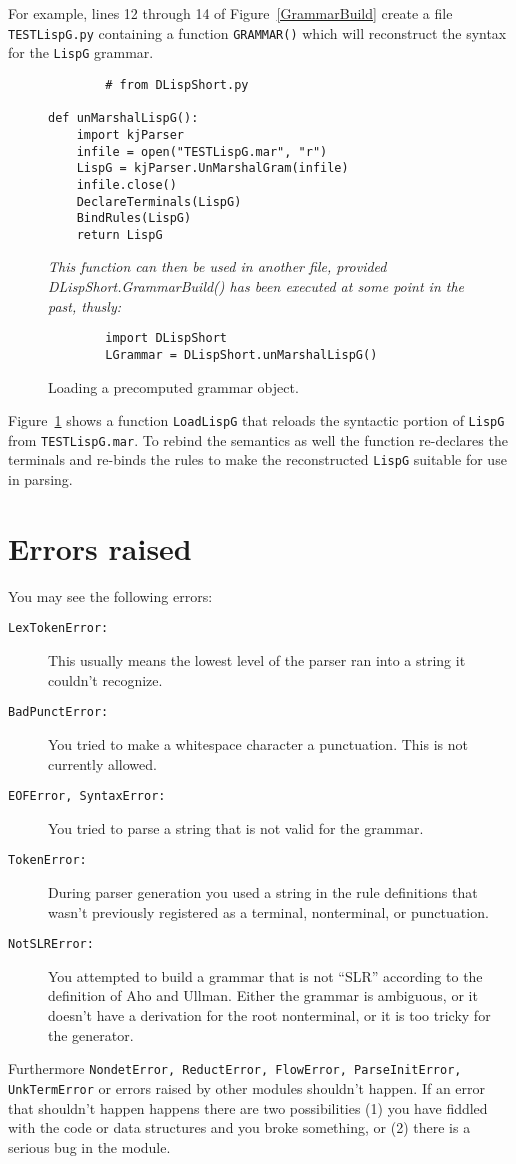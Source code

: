 For example, lines 12 through 14 of 
Figure~\ref{GrammarBuild} create a file {\tt TESTLispG.py}
containing a function {\tt GRAMMAR()} which will reconstruct
the syntax for the {\tt LispG} grammar.


\begin{figure}
\begin{verbatim}
        # from DLispShort.py

def unMarshalLispG():
    import kjParser
    infile = open("TESTLispG.mar", "r")
    LispG = kjParser.UnMarshalGram(infile)
    infile.close()
    DeclareTerminals(LispG)
    BindRules(LispG)
    return LispG
\end{verbatim}
{\em This function can then be used in another file,
provided {\em DLispShort.GrammarBuild()} has been executed
at some point in the past, thusly:}
\begin{verbatim}
        import DLispShort
        LGrammar = DLispShort.unMarshalLispG()
\end{verbatim}
\caption{Loading a precomputed grammar object.\label{Load}}
\end{figure}

Figure~\ref{Load} shows a function {\tt LoadLispG}
that reloads the syntactic
portion of {\tt LispG} from {\tt TESTLispG.mar}.  
To rebind the semantics as well the
function re-declares the terminals and re-binds the rules
to make the reconstructed {\tt LispG} suitable for use in parsing.

\section{Errors raised}

You may see the following errors:
\begin{description}
\item[\tt LexTokenError:]
This usually means the lowest level of the parser ran into a string
it couldn't recognize.
\item[\tt BadPunctError:]
You tried to make a whitespace character a punctuation.  
This is not currently allowed.
\item[\tt EOFError, SyntaxError:]
You tried to parse a string that is not valid for the grammar.
\item[\tt TokenError:]
During parser generation you used a string in the rule definitions
that wasn't previously registered as a terminal, nonterminal, or
punctuation.
\item[\tt NotSLRError:]
You attempted to build a grammar that is not ``SLR'' according
to the definition of Aho and Ullman.  Either the grammar is
ambiguous, or it doesn't have a derivation for the root
nonterminal, or it is too tricky for the generator.
\end{description}
Furthermore
{\tt NondetError, ReductError, FlowError, ParseInitError,
UnkTermError}
or errors raised by other modules
shouldn't happen.
If an error that shouldn't happen happens there are
two possibilities (1) you have fiddled with the code or
data structures and you broke something, or (2) there
is a serious bug in the module.

